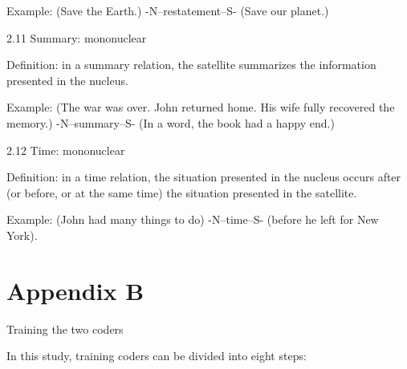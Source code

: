 \documentclass[english]{jnlp_1.3e}
\begin{document}
Example: (Save the Earth.) -N--restatement--S- (Save our planet.)


2.11 Summary: mononuclear

Definition: in a summary relation, the satellite summarizes the information presented in the nucleus. 

Example: (The war was over. John returned home. His wife fully recovered the memory.) -N--summary--S- (In a word, the book had a happy end.)


2.12 Time: mononuclear

Definition: in a time relation, the situation presented in the nucleus occurs after (or before, or at the same time) the situation presented in the satellite. 

Example: (John had many things to do) -N--time--S- (before he left for New York).


\section*{Appendix B}

\begin{center} \large{Training the two coders}  \end{center}

In this study, training coders can be divided into eight steps:
\end{document}
